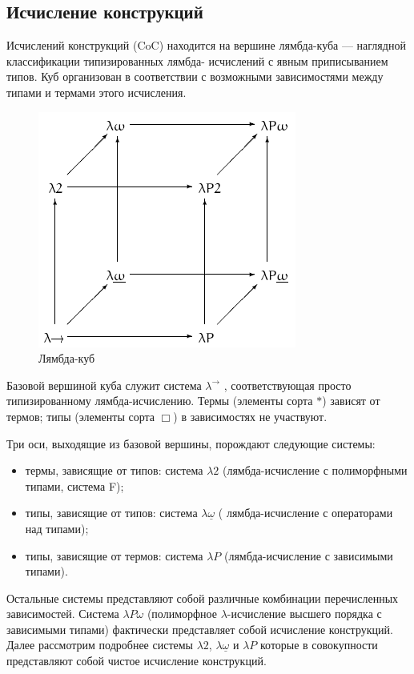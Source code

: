 \subsection{Исчисление конструкций}
Исчислений конструкций (CoC) находится на вершине лямбда-куба --- наглядной классификации типизированных лямбда-
исчислений с явным приписыванием типов. Куб организован в соответствии с 
возможными зависимостями между типами и термами этого исчисления\cite{pirs}.

\begin{figure}[ht]
	\centering
		\includegraphics{img/Lambda_cube.png}
	\caption{Лямбда-куб}
	\label{fig:Lambda_cube}
\end{figure}

Базовой вершиной куба служит система $\lambda ^{\rightarrow }$ , 
соответствующая просто типизированному лямбда-исчислению. Термы (элементы 
сорта  $\ast$) зависят от термов; типы (элементы сорта $\Box$) в зависимостях 
не участвуют. 

Три оси, выходящие из базовой вершины, порождают следующие системы:
\begin{itemize}
	\item термы, зависящие от типов: система $\lambda 2$ (лямбда-исчисление с 
полиморфными типами, система F);
	\item типы, зависящие от типов: система $\lambda {\underline {\omega }}$ (
лямбда-исчисление с операторами над типами);
	\item типы, зависящие от термов: система $\lambda P$ (лямбда-исчисление с 
зависимыми типами).
\end{itemize}

Остальные системы представляют собой различные комбинации перечисленных 
зависимостей. Система $\lambda P\omega$  (полиморфное $\lambda$-исчисление 
высшего порядка с зависимыми типами)  фактически представляет собой 
исчисление конструкций. Далее рассмотрим подробнее системы $\lambda 2$, $
\lambda {\underline {\omega }}$ и $\lambda P$ которые в совокупности 
представляют собой чистое исчисление конструкций.


